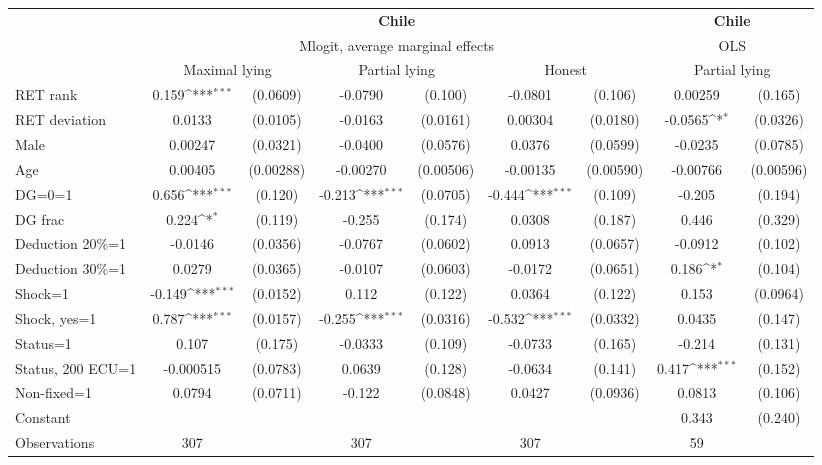 \def\sym#1{\ifmmode^{#1}\else\(^{#1}\)\fi}
\begin{tabular}{l|cccccc|cc}
\hline\hline
&\multicolumn{6}{c|}{\bf Chile}&\multicolumn{2}{c}{\bf Chile}\\ &\multicolumn{6}{c|}{Mlogit, average marginal effects }&\multicolumn{2}{c}{OLS}\\
                &\multicolumn{2}{c}{Maximal lying}&\multicolumn{2}{c}{Partial lying}&\multicolumn{2}{c}{Honest}  &\multicolumn{2}{c}{Partial lying}\\
\hline
RET rank        &    0.159\sym{***}& (0.0609)&  -0.0790         &  (0.100)&  -0.0801         &  (0.106)&  0.00259         &  (0.165)\\
RET deviation   &   0.0133         & (0.0105)&  -0.0163         & (0.0161)&  0.00304         & (0.0180)&  -0.0565\sym{*}  & (0.0326)\\
Male            &  0.00247         & (0.0321)&  -0.0400         & (0.0576)&   0.0376         & (0.0599)&  -0.0235         & (0.0785)\\
Age             &  0.00405         &(0.00288)& -0.00270         &(0.00506)& -0.00135         &(0.00590)& -0.00766         &(0.00596)\\
DG=0=1          &    0.656\sym{***}&  (0.120)&   -0.213\sym{***}& (0.0705)&   -0.444\sym{***}&  (0.109)&   -0.205         &  (0.194)\\
DG frac         &    0.224\sym{*}  &  (0.119)&   -0.255         &  (0.174)&   0.0308         &  (0.187)&    0.446         &  (0.329)\\
Deduction 20\%=1&  -0.0146         & (0.0356)&  -0.0767         & (0.0602)&   0.0913         & (0.0657)&  -0.0912         &  (0.102)\\
Deduction 30\%=1&   0.0279         & (0.0365)&  -0.0107         & (0.0603)&  -0.0172         & (0.0651)&    0.186\sym{*}  &  (0.104)\\
Shock=1         &   -0.149\sym{***}& (0.0152)&    0.112         &  (0.122)&   0.0364         &  (0.122)&    0.153         & (0.0964)\\
Shock, yes=1    &    0.787\sym{***}& (0.0157)&   -0.255\sym{***}& (0.0316)&   -0.532\sym{***}& (0.0332)&   0.0435         &  (0.147)\\
Status=1        &    0.107         &  (0.175)&  -0.0333         &  (0.109)&  -0.0733         &  (0.165)&   -0.214         &  (0.131)\\
Status, 200 ECU=1&-0.000515         & (0.0783)&   0.0639         &  (0.128)&  -0.0634         &  (0.141)&    0.417\sym{***}&  (0.152)\\
Non-fixed=1     &   0.0794         & (0.0711)&   -0.122         & (0.0848)&   0.0427         & (0.0936)&   0.0813         &  (0.106)\\
Constant        &                  &         &                  &         &                  &         &    0.343         &  (0.240)\\
\hline
Observations    &      307         &         &      307         &         &      307         &         &       59         &         \\


\end{tabular}
